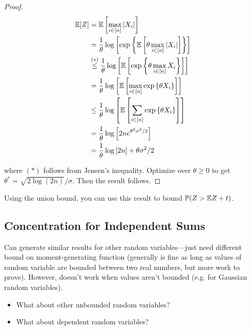 \begin{proof}

\begin{align*}
\E[Z] & = \E \left[ \max_{i \in [n]} |X_i| \right]
\\ & = \frac{1}{\theta} \log \left[  \exp \left\{ \E \left[ \theta \max_{i \in [n]} |X_i| \right]  \right\} \right]
\\ & \stackrel{(*)}{\leq} \frac{1}{\theta} \log \left[  \E \left[ \exp \left\{ \theta \max_{i \in [n]} X_i \right\} \right]  \right]  
\\ & =  \frac{1}{\theta} \log \left[  \E \left[  \max_{i \in [n]} \exp \left\{ \theta X_i \right\} \right]  \right] 
\\ & \leq  \frac{1}{\theta} \log \left[  \E \left[  \sum_{i \in [n]} \exp \left\{ \theta X_i \right\} \right]  \right] 
\\ & = \frac{1}{\theta} \log \left[  2ne^{\theta^2 \sigma^2/2} \right] 
\\ & = \frac{1}{\theta} \log \left[  2n \right]  + \theta \sigma^2/2
\end{align*}

where \((*)\) follows from Jensen's inequality. Optimize over \(\theta \geq 0\) to get \(\theta^* = \sqrt{2 \log (2n)}/\sigma \). Then the result follows.

\end{proof}

\begin{remark}

Using the union bound, you can use this result to bound \(\mathbb{P}(Z > \E Z + t)\).

\end{remark}

\subsection{Concentration for Independent Sums}

Can generate similar results for other random variables---just need different bound on moment-generating function (generally is fine as long as values of random variable are bounded between two real numbers, but more work to prove). However, doesn't work when values aren't bounded (e.g. for Gaussian random variables).

\begin{itemize}

\item What about other unbounded random variables?

\item What about dependent random variables?

\end{itemize}

